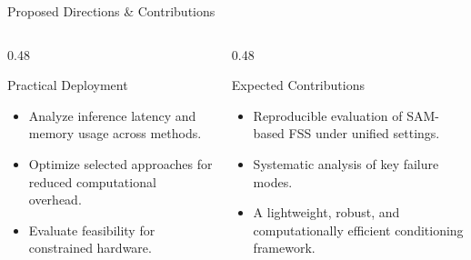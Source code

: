 \documentclass[aspectratio=169, 10pt]{beamer}
\begin{document}
\begin{frame}{Proposed Directions \& Contributions}
    \begin{columns}[T]
        \begin{column}{0.48\textwidth}
            \begin{block}{Practical Deployment}
                \footnotesize
                \begin{itemize}
                    \item Analyze inference latency and memory usage across methods.
                    \item Optimize selected approaches for reduced computational overhead.
                    \item Evaluate feasibility for constrained hardware.
                \end{itemize}
            \end{block}
        \end{column}
        \begin{column}{0.48\textwidth}
            \begin{block}{Expected Contributions}
                \footnotesize
                \begin{itemize}
                    \item Reproducible evaluation of SAM-based FSS under unified settings.
                    \item Systematic analysis of key failure modes.
                    \item A lightweight, robust, and computationally efficient conditioning framework.
                \end{itemize}
            \end{block}
        \end{column}
    \end{columns}
\end{frame}
\end{document}
